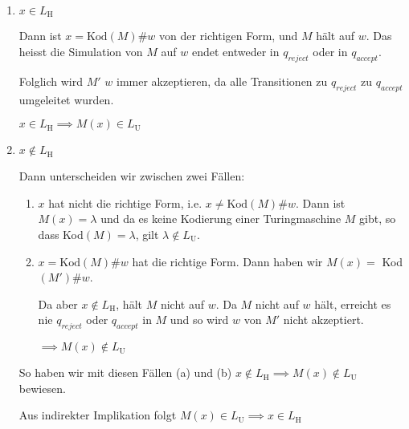                     \begin{enumerate}[label=(\roman*)]
                        \item $x \in L_{\text{H}}$
            
                            Dann ist $x = \text{Kod}(M)\#w$ von der richtigen Form, und $M$ hält auf $w$. 
                            Das heisst die Simulation von $M$ auf $w$ endet entweder in $q_{reject}$ oder in $q_{accept}$. 
                            
                            Folglich wird $M'$ $w$ immer akzeptieren, da alle Transitionen zu $q_{reject}$ zu $q_{accept}$ umgeleitet wurden. 
                            
                            $x \in L_{\text{H}} \implies M(x) \in L_{\text{U}}$
            
                        \item $x \notin L_{\text{H}}$
            
                            Dann unterscheiden wir zwischen zwei Fällen:
            
                            \begin{enumerate}[label=(\alph*)]
                                \item 
                                
                                $x$ hat nicht die richtige Form, i.e. $x \neq \text{Kod}(M)\#w$.
                                Dann ist $M(x) = \lambda$ und da es keine Kodierung einer Turingmaschine $M$ gibt, so dass Kod$(M) = \lambda$, gilt   $\lambda \notin L_{\text{U}}$.
                        
            
               
                \item
            
                                $x = \text{Kod}(M)\#w$ hat die richtige Form. Dann haben wir $M(x) = $ Kod$(M')\#w$.
                                
                                Da aber $x \notin L_{\text{H}}$, hält $M$ nicht auf $w$. Da $M$ nicht auf $w$ hält, erreicht es nie $q_{reject}$ oder $q_{accept}$ in $M$ und so wird $w$ von $M'$ nicht akzeptiert. 
            
                                $\implies M(x) \notin L_{\text{U}}$
            
                               
                                
                                
                            \end{enumerate}
                            
                             So haben wir mit diesen Fällen (a) und (b) $x \notin L_{\text{H}} \implies M(x) \notin L_{\text{U}}$ bewiesen. 
                             
                             Aus indirekter Implikation folgt $M(x) \in L_{\text{U}} \implies x \in L_{\text{H}}$
                                 
                    \end{enumerate}
            

